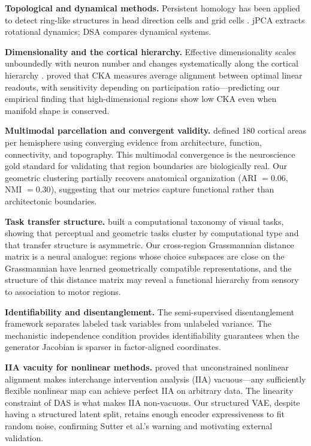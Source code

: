 \documentclass{article}
\begin{document}
\textbf{Topological and dynamical methods.} Persistent homology has been applied to detect ring-like structures in head direction cells \citep{gardner2022toroidal} and grid cells \citep{rybakken2019decoding}. jPCA \citep{churchland2012neural} extracts rotational dynamics; DSA \citep{ostrow2023beyond} compares dynamical systems.

\textbf{Dimensionality and the cortical hierarchy.} Effective dimensionality scales unboundedly with neuron number \citep{stringer2024unbounded} and changes systematically along the cortical hierarchy \citep{huntenburg2024categorical}. \citet{harvey2024representational} proved that CKA measures average alignment between optimal linear readouts, with sensitivity depending on participation ratio---predicting our empirical finding that high-dimensional regions show low CKA even when manifold shape is conserved.

\textbf{Multimodal parcellation and convergent validity.} \citet{glasser2016multi} defined 180 cortical areas per hemisphere using converging evidence from architecture, function, connectivity, and topography. This multimodal convergence is the neuroscience gold standard for validating that region boundaries are biologically real. Our geometric clustering partially recovers anatomical organization (ARI $= 0.06$, NMI $= 0.30$), suggesting that our metrics capture functional rather than architectonic boundaries.

\textbf{Task transfer structure.} \citet{zamir2018taskonomy} built a computational taxonomy of visual tasks, showing that perceptual and geometric tasks cluster by computational type and that transfer structure is asymmetric. Our cross-region Grassmannian distance matrix is a neural analogue: regions whose choice subspaces are close on the Grassmannian have learned geometrically compatible representations, and the structure of this distance matrix may reveal a functional hierarchy from sensory to association to motor regions.

\textbf{Identifiability and disentanglement.} The semi-supervised disentanglement framework \citep{narayanaswamy2017learning} separates labeled task variables from unlabeled variance. The mechanistic independence condition \citep{sid2026mechanistic} provides identifiability guarantees when the generator Jacobian is sparser in factor-aligned coordinates.

\textbf{IIA vacuity for nonlinear methods.} \citet{sutter2025iia} proved that unconstrained nonlinear alignment makes interchange intervention analysis (IIA) vacuous---any sufficiently flexible nonlinear map can achieve perfect IIA on arbitrary data. The linearity constraint of DAS \citep{geiger2024causal} is what makes IIA non-vacuous. Our structured VAE, despite having a structured latent split, retains enough encoder expressiveness to fit random noise, confirming Sutter et al.'s warning and motivating external validation.
\end{document}
